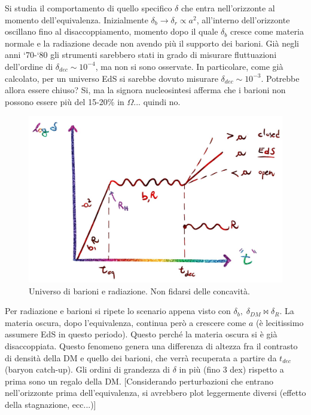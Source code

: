\vspace{1em}
\begin{example} Si studia il comportamento di quello specifico $\delta$ che entra nell'orizzonte al momento dell'equivalenza. Inizialmente $\delta_b \to \delta_r \propto a^2$, all'interno dell'orizzonte oscillano fino al disaccoppiamento, momento dopo il quale $\delta_b$ cresce come materia normale e la radiazione decade non avendo più il supporto dei barioni. Già negli anni `70-`80 gli strumenti sarebbero stati in grado di misurare fluttuazioni dell'ordine di $\delta_{dec}\sim 10^{-4}$, ma non si sono osservate. In particolare, come già calcolato, per un universo EdS si sarebbe dovuto misurare $\delta_{dec}\sim 10^{-3}$. Potrebbe allora essere chiuso? Si, ma la signora nucleosintesi afferma che i barioni non possono essere più del 15-20\% in $\Omega$... quindi no.
\end{example}
\vspace*{-2em}
\begin{figure}[H]
    \centering
    \includegraphics[width=.9 \textwidth]{Pictures/6/growingfactor.jpg}
    \caption{Universo di barioni e radiazione. Non fidarsi delle concavità.}
\end{figure}

\begin{example}
Per radiazione e barioni si ripete lo scenario appena visto con $\delta_b,\; \delta_{DM} \bowtie \delta_R$. La materia oscura, dopo l'equivalenza, continua però a crescere come $a$ (è lecitissimo assumere EdS in questo periodo). Questo perché la materia oscura si è già disaccoppiata. Questo fenomeno genera una differenza di altezza fra il contrasto di densità della DM e quello dei barioni, che verrà recuperata a partire da $t_{dec}$ (baryon catch-up). Gli ordini di grandezza di $\delta$ in più (fino 3 dex) rispetto a prima sono un regalo della DM.
[Considerando perturbazioni che entrano nell'orizzonte prima dell'equivalenza, si avrebbero plot leggermente diversi (effetto della stagnazione, ecc...)]
\end{example}


